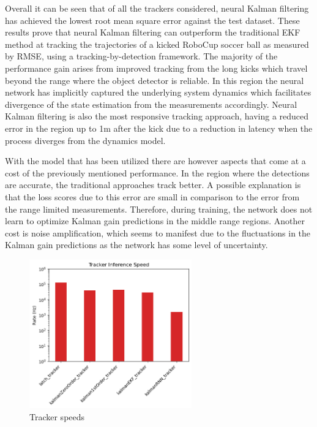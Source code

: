\documentclass[a4paper,twoside,12pt]{report}
\begin{document}
Overall it can be seen that of all the trackers considered, neural Kalman filtering has achieved the lowest root mean square error against the test dataset. These results prove that neural Kalman filtering can outperform the traditional EKF method at tracking the trajectories of a kicked RoboCup soccer ball as measured by RMSE, using a tracking-by-detection framework. The majority of the performance gain arises from improved tracking from the long kicks which travel beyond the range where the object detector is reliable. In this region the neural network has implicitly captured the underlying system dynamics which facilitates divergence of the state estimation from the measurements accordingly. Neural Kalman filtering is also the most responsive tracking approach, having a reduced error in the region up to 1m after the kick due to a reduction in latency when the process diverges from the dynamics model. 

With the model that has been utilized there are however aspects that come at a cost of the previously mentioned performance. In the region where the detections are accurate, the traditional approaches track better. A possible explanation is that the loss scores due to this error are small in comparison to the error from the range limited measurements. Therefore, during training, the network does not learn to optimize Kalman gain predictions in the middle range regions. Another cost is noise amplification, which seems to manifest due to the fluctuations in the Kalman gain predictions as the network has some level of uncertainty.


\begin{figure}[h!]
\begin{center}
\includegraphics[width=7cm]{images/tracker_speeds.png}
\caption{Tracker speeds}
\label{fig:trackspeeds}
\end{center}
\end{figure}
\end{document}
